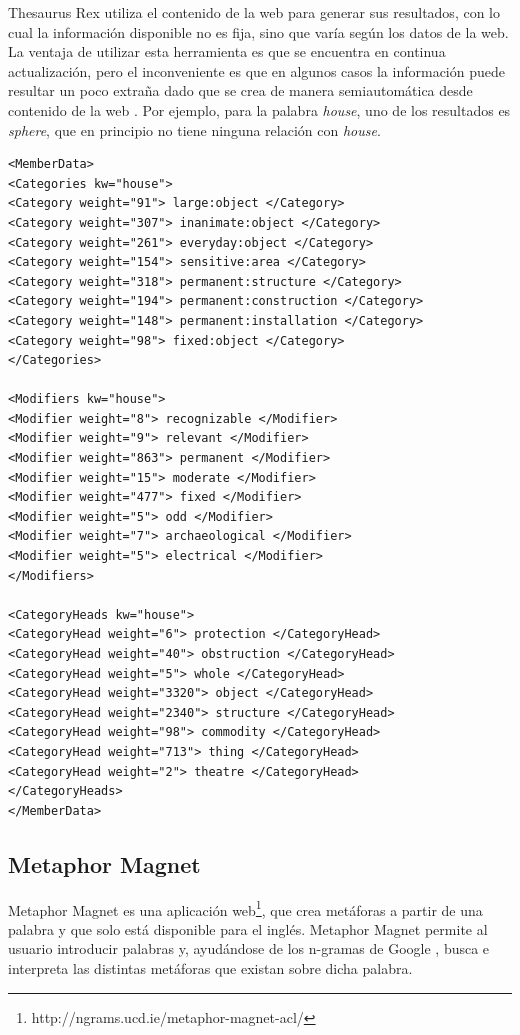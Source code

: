 Thesaurus Rex utiliza el contenido de la web para generar sus resultados, con lo cual la información disponible no es fija, sino que varía según los datos de la web.
La ventaja de utilizar esta herramienta es que se encuentra en continua actualización, pero el inconveniente es que en algunos casos la información puede resultar un poco extraña dado que se crea de manera semiautomática desde contenido de la web \citep{VealeT2013}. Por ejemplo, para la palabra \textit{house}, uno de los resultados es \textit{sphere}, que en principio no tiene ninguna relación con \textit{house}.

\lstset{language=XML}
\begin{lstlisting}[caption=XML devuelto por Thesaurus Rex para la palabra \textit{house}, label={lst:xmlthesaurusrex}, frame=single]
<MemberData>
<Categories kw="house">
<Category weight="91"> large:object </Category>
<Category weight="307"> inanimate:object </Category>
<Category weight="261"> everyday:object </Category>
<Category weight="154"> sensitive:area </Category>
<Category weight="318"> permanent:structure </Category>
<Category weight="194"> permanent:construction </Category>
<Category weight="148"> permanent:installation </Category>
<Category weight="98"> fixed:object </Category>
</Categories>

<Modifiers kw="house">
<Modifier weight="8"> recognizable </Modifier>
<Modifier weight="9"> relevant </Modifier>
<Modifier weight="863"> permanent </Modifier>
<Modifier weight="15"> moderate </Modifier>
<Modifier weight="477"> fixed </Modifier>
<Modifier weight="5"> odd </Modifier>
<Modifier weight="7"> archaeological </Modifier>
<Modifier weight="5"> electrical </Modifier>
</Modifiers>

<CategoryHeads kw="house">
<CategoryHead weight="6"> protection </CategoryHead>
<CategoryHead weight="40"> obstruction </CategoryHead>
<CategoryHead weight="5"> whole </CategoryHead>
<CategoryHead weight="3320"> object </CategoryHead>
<CategoryHead weight="2340"> structure </CategoryHead>
<CategoryHead weight="98"> commodity </CategoryHead>
<CategoryHead weight="713"> thing </CategoryHead>
<CategoryHead weight="2"> theatre </CategoryHead>
</CategoryHeads>
</MemberData>

\end{lstlisting}



\subsection{Metaphor Magnet}
\label{cap:subsec:metaphormagnet}
Metaphor Magnet es una aplicación web\footnote{http://ngrams.ucd.ie/metaphor-magnet-acl/}, que crea metáforas a partir de una palabra y que solo está disponible para el inglés.
Metaphor Magnet permite al usuario introducir palabras y, ayudándose de los n-gramas de Google \citep{VealeT2012}, busca e interpreta las distintas metáforas que existan sobre dicha palabra.

